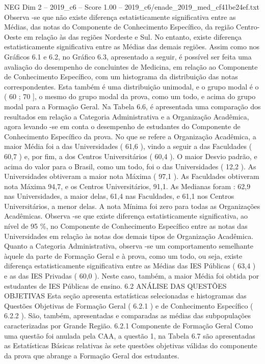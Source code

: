 \begin{textsample}{NEG Dim 2 – 2019\_c6 – Score 1.00 – 2019\_c6/enade\_2019\_med\_cf41be24ef.txt}
Observa -se que não existe diferença estatisticamente significativa entre as Médias, das notas do Componente de Conhecimento Específico, da região Centro-Oeste em relação às das regiões Nordeste e Sul.
No entanto, existe diferença estatisticamente significativa entre as Médias das demais regiões.
Assim como nos Gráficos 6.1 e 6.2, no Gráfico 6.3, apresentado a seguir, é possível ser feita uma avaliação do desempenho de concluintes de Medicina, em relação ao Componente de Conhecimento Específico, com um histograma da distribuição das notas correspondentes.
Esta também é uma distribuição unimodal, e o grupo modal é o ( 60 ; 70 ], o mesmo do grupo modal da prova, como um todo, e acima do grupo modal para a Formação Geral.
Na Tabela 6.6, é apresentada uma comparação dos resultados em relação a Categoria Administrativa e a Organização Acadêmica, agora levando -se em conta o desempenho de estudantes do Componente de Conhecimento Específico da prova.
No que se refere a Organização Acadêmica, a maior Média foi a das Universidades ( 61,6 ), vindo a seguir a das Faculdades ( 60,7 ) e, por fim, a dos Centros Universitários ( 60,4 ).
O maior Desvio padrão, e acima do valor para o Brasil, como um todo, foi o das Universidades ( 12,2 ).
As Universidades obtiveram a maior nota Máxima ( 97,1 ).
As Faculdades obtiveram nota Máxima 94,7, e os Centros Universitários, 91,1.
As Medianas foram : 62,9 nas Universidades, a maior delas, 61,4 nas Faculdades, e 61,1 nos Centros Universitários, a menor delas.
A nota Mínima foi zero para todas as Organizações Acadêmicas.
Observa -se que existe diferença estatisticamente significativa, ao nível de 95 \%, no Componente de Conhecimento Específico entre as notas das Universidades em relação às notas dos demais tipos de Organização Acadêmica.
Quanto a Categoria Administrativa, observa -se um comportamento semelhante àquele da parte de Formação Geral e à prova, como um todo, ou seja, existe diferença estatisticamente significativa entre as Médias das IES Públicas ( 63,4 ) e as das IES Privadas ( 60,0 ).
Neste caso, também, a maior Média foi obtida por estudantes de IES Públicas de ensino. 6.2 ANÁLISE DAS QUESTÕES OBJETIVAS Esta seção apresenta estatísticas selecionadas e histogramas das Questões Objetivas de Formação Geral ( 6.2.1 ) e de Conhecimento Específico ( 6.2.2 ).
São, também, apresentadas e comparadas as médias das subpopulações caracterizadas por Grande Região. 6.2.1 Componente de Formação Geral Como uma questão foi anulada pela CAA, a questão 1, na Tabela 6.7 são apresentadas as Estatísticas Básicas relativas às sete questões objetivas válidas do componente da prova que abrange a Formação Geral dos estudantes.

\end{textsample}
